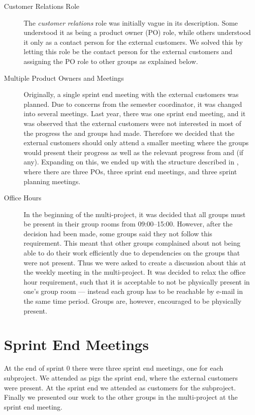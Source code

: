 \begin{description}
  \item[Customer Relations Role] The \emph{customer relations} role was initially vague in its description. Some understood it as being a product owner (PO) role, while others understood it only as a contact person for the external customers. We solved this by letting this role be the contact person for the external customers and assigning the PO role to other groups as explained below.
  \item[Multiple Product Owners and Meetings] Originally, a single sprint end meeting with the external customers was planned. Due to concerns from the semester coordinator, it was changed into several meetings. Last year, there was one sprint end meeting, and it was observed that the external customers were not interested in most of the progress the \db and \bd groups had made. Therefore we decided that the external customers should only attend a smaller meeting where the \gui groups would present their progress as well as the relevant progress from \db and \bd (if any). Expanding on this, we ended up with the structure described in , where there are three POs, three sprint end meetings, and three sprint planning meetings.
  \item[Office Hours] In the beginning of the multi-project, it was decided that all groups must be present in their group rooms from 09:00--15:00. However, after the decision had been made, some groups said they not follow this requirement. This meant that other groups complained about not being able to do their work efficiently due to dependencies on the groups that were not present. Thus we were asked to create a discussion about this at the weekly meeting in the multi-project. It was decided to relax the office hour requirement, such that it is acceptable to not be physically present in one's group room --- instead each group has to be reachable by e-mail in the same time period. Groups are, however, encouraged to be physically present.
\end{description}

\section{Sprint End Meetings}
At the end of sprint 0 there were three sprint end meetings, one for each subproject. We attended as pigs the \gui sprint end, where the external customers were present. At the \db sprint end we attended as customers for the \db subproject. Finally we presented our work to the other groups in the multi-project at the \bd sprint end meeting.


